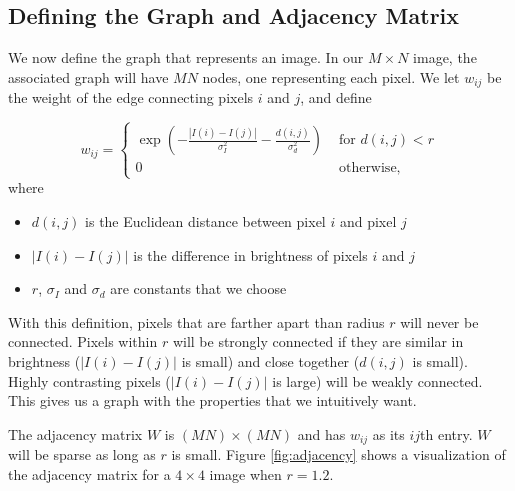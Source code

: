 \subsection*{Defining the Graph and Adjacency Matrix}

We now define the graph that represents an image. In our $M \times N$ image, the associated graph will have $MN$ nodes, one representing each pixel. We let $w_{ij}$ be the weight of the edge connecting pixels $i$ and $j$, and define

 \begin{equation}
 \label{eq:adjacency}
w_{ij} = \begin{cases} \exp(-\frac{|I(i) - I(j)|}{\sigma_I^2}-\frac{d(i,j)}{\sigma_d^2}) & \mbox{ for $d(i,j) < r$} \\ 0 & \mbox{ otherwise,} \end{cases}
\end{equation}
where
\begin{itemize}
	\item$d(i,j)$ is the Euclidean distance between pixel $i$ and pixel $j$
	\item $|I(i) - I(j)|$ is the difference in brightness of pixels $i$ and $j$
	\item $r$, $\sigma_I$ and $\sigma_d$ are constants that we choose
\end{itemize}

With this definition, pixels that are farther apart than radius $r$ will never be connected. 
Pixels within $r$ will be strongly connected if they are similar in brightness ($|I(i) - I(j)|$ is small) and close together ($d(i,j)$ is small).
Highly contrasting pixels ($|I(i) - I(j)|$ is large) will be weakly connected. 
This gives us a graph with the properties that we intuitively want.

The adjacency matrix $W$ is $(MN) \times (MN)$ and has $w_{ij}$ as its $ij$th entry. 
$W$ will be sparse as long as $r$ is small. 
Figure \ref{fig:adjacency} shows a visualization of the adjacency matrix for a $4 \times 4$ image when $r=1.2$.


